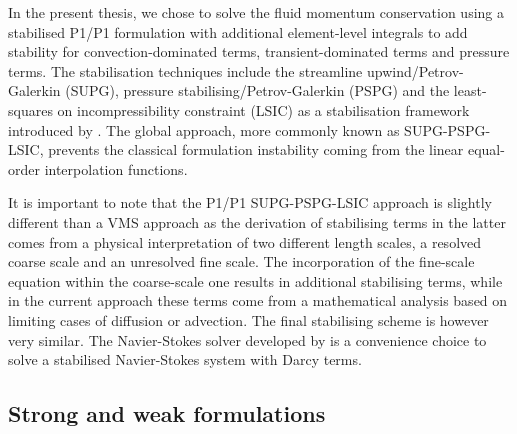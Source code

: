 In the present thesis, we chose to solve the fluid momentum conservation using a stabilised P1/P1 formulation with additional 
element-level integrals to add stability for convection-dominated terms, transient-dominated terms and pressure terms. 
The stabilisation techniques include the streamline upwind/Petrov-Galerkin (SUPG), pressure stabilising/Petrov-Galerkin (PSPG) and
the least-squares on incompressibility constraint (LSIC) as a stabilisation framework introduced by \citet{tezduyar_incompressible_1992}.
The global approach, more commonly known as SUPG-PSPG-LSIC, prevents the classical formulation instability coming from the 
linear equal-order interpolation functions.

It is important to note that the P1/P1 SUPG-PSPG-LSIC approach is slightly different than a VMS approach 
as the derivation of stabilising terms in the latter comes from a physical interpretation of two different 
length scales, a resolved coarse scale and an unresolved fine scale. The incorporation of the fine-scale equation
within the coarse-scale one results in additional stabilising terms, while in the current approach these terms
come from a mathematical analysis based on limiting cases of diffusion or advection. 
The final stabilising scheme is however very similar.
The Navier-Stokes solver developed by \citet{hachem_stabilized_2010,rivaux_simulation_2011} is a convenience choice 
to solve a stabilised Navier-Stokes system with Darcy terms. 

\subsection{Strong and weak formulations}

